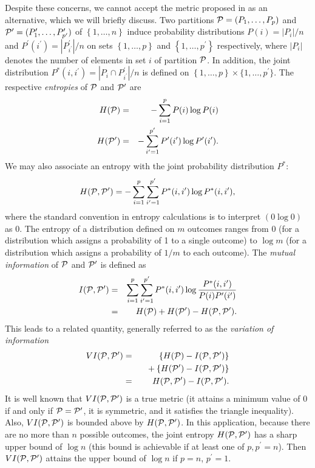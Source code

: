 \documentclass[twoside,10pt,twocolumn]{article}
\newcommand{\calp}{{\cal P}}
\begin{document}
Despite these concerns, we cannot accept the metric proposed in \citet{BrownDexter2012} as an alternative, 
which we will briefly discuss. Two partitions $\calp = (P_1, \ldots, P_p)$ and $\calp^\prime = (P^\prime_1, 
\ldots, P^\prime_{p^\prime})$ of $\left\{ 1, \ldots, n\right\}$ induce probability distributions $P(i) = |
P_i|/n$ and $P^\prime(i^\prime) = |P^\prime_{i^\prime}|/n$ on sets $\left\{ 1, \ldots, p\right\}$ and $\left
\{ 1, \ldots, p^\prime\right\}$ respectively, where $|P_i|$ denotes the number of elements in set $i$ of 
partition $\calp$. In addition, the joint distribution  $P^*(i,i^\prime) = |P_i \cap P^\prime_{i^\prime}|/n$ 
is defined on  $\left\{ 1, \ldots, p\right\} \times \{ 1, \ldots, p^\prime \}$. The respective 
\emph{entropies} of  $\calp$ and $\calp^\prime$ are
\begin{eqnarray}
H(\calp) &=& - \sum_{i=1}^p P(i) \log P(i) \\
H(\calp^\prime) &=& - \sum_{i^\prime =1}^{p^\prime} P^\prime(i^\prime) \log P^\prime(i^\prime).
\end{eqnarray}
We may also associate an entropy with the joint probability distribution $P^*$:
\begin{displaymath}
H(\calp, \calp^\prime) = - \sum_{i=1}^p \sum_{i^\prime=1}^{p^\prime} P^*(i, i^\prime) \log P^*(i, i^\prime),
\end{displaymath}
where the standard convention in entropy calculations is to interpret $(0\log 0)$ as 0. The entropy of a 
distribution defined on $m$ outcomes ranges from 0 (for a distribution which assigns a probability of 1 to a 
single outcome) to $\log m$ (for a distribution which assigns a probability of $1/m$ to each outcome). The 
\emph{mutual information} of  $\calp$ and $\calp^\prime$ is defined as 
\begin{eqnarray*}
I(\calp, \calp^\prime) & = & \sum_{i=1}^p \sum_{i^\prime=1}^{p^\prime} P^*(i, i^\prime) \log \frac{P^*(i, i^
\prime)}{P(i)P^\prime(i^\prime)} \\
	& = & H(\calp) + H(\calp^\prime) - H(\calp, \calp^\prime).
\end{eqnarray*}
This leads to a related quantity, generally referred to as the \emph{variation of information}
\begin{eqnarray*}
VI(\calp, \calp^\prime) & = & \{ H(\calp) - I(\calp, \calp^\prime) \}  \\
&\mbox{}& ~~ \mbox{}+  \{ H(\calp^\prime) - I(\calp, \calp^\prime) \} \\
& = & H(\calp, \calp^\prime) -  I(\calp, \calp^\prime).
\end{eqnarray*}
It is well known that  $VI(\calp, \calp^\prime)$ is a true metric (it attains a minimum value of 0 if and 
only if $\calp = \calp^\prime$, it is symmetric, and it satisfies the triangle inequality). Also, $VI(\calp, 
\calp^\prime)$ is bounded above by $H(\calp, \calp^\prime)$. In this application, because there are no more 
than $n$ possible outcomes, the joint entropy $H(\calp, \calp^\prime)$ has a sharp upper bound of $\log n$ 
(this bound is achievable if at least one of $p, p^\prime = n$). Then $VI(\calp, \calp^\prime)$ attains the 
upper bound of $\log n$ if $p = n$, $p^\prime = 1$. 
\end{document}
